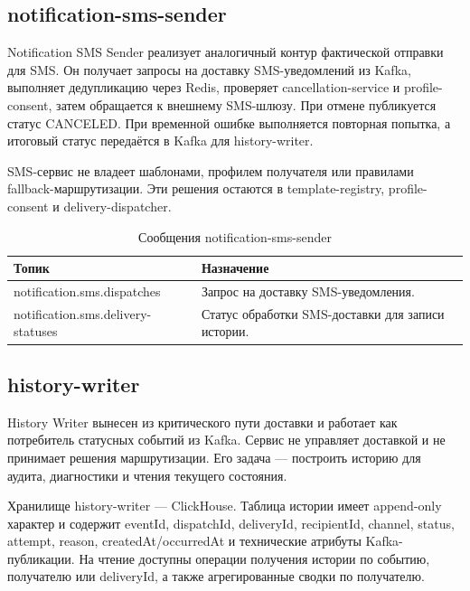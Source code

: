 \subsection{notification-sms-sender}

Notification SMS Sender реализует аналогичный контур фактической отправки для SMS. Он получает запросы на доставку SMS-уведомлений из Kafka, выполняет дедупликацию через Redis, проверяет cancellation-service и profile-consent, затем обращается к внешнему SMS-шлюзу. При отмене публикуется статус CANCELED. При временной ошибке выполняется повторная попытка, а итоговый статус передаётся в Kafka для history-writer.

SMS-сервис не владеет шаблонами, профилем получателя или правилами fallback-маршрутизации. Эти решения остаются в template-registry, profile-consent и delivery-dispatcher.

\begin{table}[H]
    \centering
    \footnotesize
    \renewcommand{\arraystretch}{1.15}
    \caption{Сообщения notification-sms-sender}
    \label{tab:impl-sms-messages}
    \begin{tabular}{|L{0.34\textwidth}|L{0.56\textwidth}|}
        \hline
        \textbf{Топик} & \textbf{Назначение} \\
        \hline
        notification.sms.dispatches & Запрос на доставку SMS-уведомления. \\
        \hline
        notification.sms.delivery-statuses & Статус обработки SMS-доставки для записи истории. \\
        \hline
    \end{tabular}
\end{table}

\subsection{history-writer}

History Writer вынесен из критического пути доставки и работает как потребитель статусных событий из Kafka. Сервис не управляет доставкой и не принимает решения маршрутизации. Его задача --- построить историю для аудита, диагностики и чтения текущего состояния.

Хранилище history-writer --- ClickHouse. Таблица истории имеет append-only характер и содержит eventId, dispatchId, deliveryId, recipientId, channel, status, attempt, reason, createdAt/occurredAt и технические атрибуты Kafka-публикации. На чтение доступны операции получения истории по событию, получателю или deliveryId, а также агрегированные сводки по получателю.

